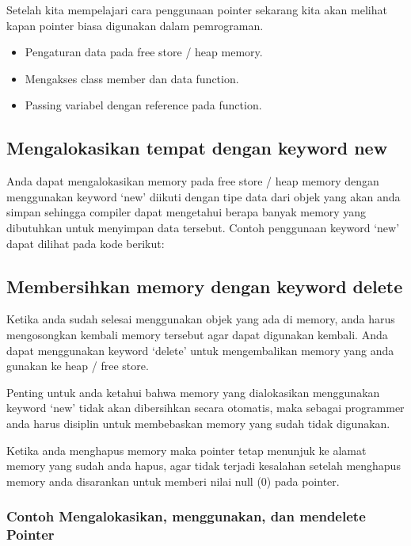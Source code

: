 Setelah kita mempelajari cara penggunaan pointer sekarang kita akan
melihat kapan pointer biasa digunakan dalam pemrograman.

\begin{itemize}

\item
  Pengaturan data pada free store / heap memory.
\item
  Mengakses class member dan data function.
\item
  Passing variabel dengan reference pada function.
\end{itemize}

\subsection{Mengalokasikan tempat dengan keyword new}\label{mengalokasikan-tempat-dengan-keyword-new}

Anda dapat mengalokasikan memory pada free store / heap memory dengan
menggunakan keyword `new' diikuti dengan tipe data dari objek yang akan
anda simpan sehingga compiler dapat mengetahui berapa banyak memory yang
dibutuhkan untuk menyimpan data tersebut. Contoh penggunaan keyword
`new' dapat dilihat pada kode berikut:



\subsection{Membersihkan memory dengan keyword delete}\label{membersihkan-memory-dengan-keyword-delete}

Ketika anda sudah selesai menggunakan objek yang ada di memory, anda
harus mengosongkan kembali memory tersebut agar dapat digunakan kembali.
Anda dapat menggunakan keyword `delete' untuk mengembalikan memory yang
anda gunakan ke heap / free store.

Penting untuk anda ketahui bahwa memory yang dialokasikan menggunakan
keyword `new' tidak akan dibersihkan secara otomatis, maka sebagai
programmer anda harus disiplin untuk membebaskan memory yang sudah tidak
digunakan.

Ketika anda menghapus memory maka pointer tetap menunjuk ke alamat
memory yang sudah anda hapus, agar tidak terjadi kesalahan setelah
menghapus memory anda disarankan untuk memberi nilai null (0) pada
pointer.

\subsubsection*{Contoh  Mengalokasikan, menggunakan, dan mendelete Pointer}

